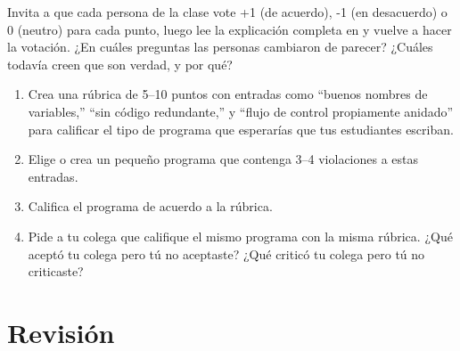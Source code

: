 Invita a que cada persona de la clase vote +1 (de acuerdo), -1 (en desacuerdo) o 0 (neutro) para cada punto,
luego lee la explicación completa en
y vuelve a hacer la votación.
¿En cuáles preguntas las personas cambiaron de parecer?
¿Cuáles todavía creen que son verdad, y por qué?


\begin{enumerate}

\item
  Crea una rúbrica de 5--10 puntos
  con entradas como ``buenos nombres de variables,'' ``sin código redundante,'' y ``flujo de control propiamente anidado''
  para calificar el tipo de programa que esperarías que tus estudiantes escriban.

\item
  Elige o crea un pequeño programa que contenga 3--4 violaciones a estas entradas.

\item
  Califica el programa de acuerdo a la rúbrica.

\item
  Pide a tu colega que califique el mismo programa con la misma rúbrica.
  ¿Qué aceptó tu colega pero tú no aceptaste?
  ¿Qué criticó tu colega pero tú no criticaste?

\end{enumerate}

\section*{Revisión}

